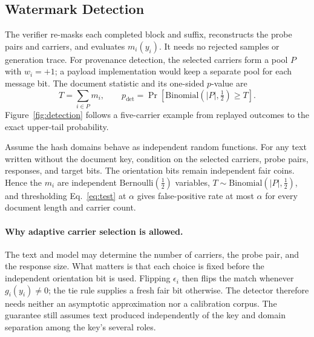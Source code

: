 \subsection{Watermark Detection}
\label{sec:theory}

The verifier re-masks each completed block and suffix, reconstructs the probe pairs and carriers,
and evaluates $m_i(y_i)$. It needs no rejected samples or generation trace. For provenance
detection, the selected carriers form a pool $P$ with $w_i=+1$; a payload implementation would
keep a separate pool for each message bit. The document statistic and its one-sided $p$-value are
\begin{equation}
T=\sum_{i\in P}m_i,\qquad
p_{\mathrm{det}}=\Pr\!\left[\mathrm{Binomial}(|P|,\tfrac12)\geq T\right].
\label{eq:test}
\end{equation}
Figure~\ref{fig:detection} follows a five-carrier example from replayed outcomes to the exact
upper-tail probability.



\begin{proposition}
\label{prop:fpr}
Assume the hash domains behave as independent random functions. For any text written without the
document key, condition on the selected carriers, probe pairs, responses, and target bits. The
orientation bits remain independent fair coins. Hence the $m_i$ are independent
$\mathrm{Bernoulli}(\tfrac12)$ variables, $T\sim\mathrm{Binomial}(|P|,\tfrac12)$, and
thresholding Eq.~\eqref{eq:test} at $\alpha$ gives false-positive rate at most $\alpha$ for every
document length and carrier count.
\end{proposition}

\paragraph{Why adaptive carrier selection is allowed.}
The text and model may determine the number of carriers, the probe pair, and the response size.
What matters is that each choice is fixed before the independent orientation bit is used. Flipping
$\epsilon_i$ then flips the match whenever $g_i(y_i)\neq0$; the tie rule supplies a fresh fair bit
otherwise. The detector therefore needs neither an asymptotic approximation nor a calibration
corpus. The guarantee still assumes text produced independently of the key and domain separation
among the key's several roles.
